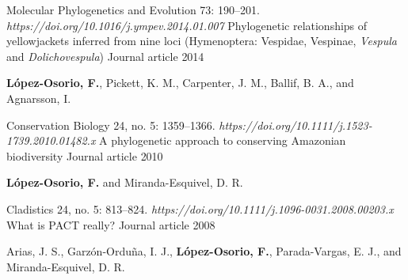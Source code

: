 \begin{cventries}
  \cventry
    {Molecular Phylogenetics and Evolution 73: 190–201. \textit{https://doi.org/10.1016/j.ympev.2014.01.007}} %
    {Phylogenetic relationships of yellowjackets inferred from nine loci 
    (Hymenoptera: Vespidae, Vespinae, \textit{Vespula} and \textit{Dolichovespula})} %
    {Journal article} %
    {2014} %
    {
      \begin{cvitems} %
        \item {\textbf{López-Osorio, F.}, Pickett, K. M., Carpenter, J. M., Ballif, B. A., 
        and Agnarsson, I.}
      \end{cvitems}
    }

  \cventry
    {Conservation Biology 24, no. 5: 1359–1366. \textit{https://doi.org/10.1111/j.1523-1739.2010.01482.x}} %
    {A phylogenetic approach to conserving Amazonian biodiversity} %
    {Journal article} %
    {2010} %
    {
      \begin{cvitems} %
        \item {\textbf{López-Osorio, F.} and Miranda-Esquivel, D. R.}
      \end{cvitems}
    }

  \cventry
    {Cladistics 24, no. 5: 813–824. \textit{https://doi.org/10.1111/j.1096-0031.2008.00203.x}} %
    {What is PACT really?} %
    {Journal article} %
    {2008} %
    {
      \begin{cvitems} %
        \item {Arias, J. S., Garzón-Orduña, I. J., \textbf{López-Osorio, F.}, 
        Parada-Vargas, E. J., and Miranda-Esquivel, D. R.}
      \end{cvitems}
    }


\end{cventries}
